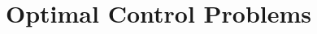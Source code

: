 \documentclass[11pt]{article}
\begin{document}


%

%
%
\setcounter{page}{7}
\setcounter{section}{4}
%
%
\section{Optimal Control Problems}
\label{sec:optcont}

%
%
%
%
%
%




\end{document}
